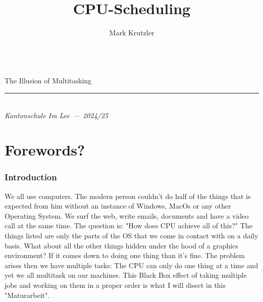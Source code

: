 \documentclass{report}
\title{CPU-Scheduling}
\author{Mark Krutzler}
\newcommand{\thesubtitle}{The Illusion of Multitasking}
\newcommand{\currentdate}{2024/25}
\newcommand{\auinstitution}{Kantonschule Im Lee}
\renewcommand{\maketitle}{
\begin{center}


{\Huge\bfseries
\thetitle}
\vspace{0.5em}\\
{\LARGE\thesubtitle}


{\rule{0.4\textwidth}{.4pt}}

{\bfseries \theauthor}\\
\textit{\auinstitution \ --- \currentdate}
\end{center}
}
\begin{document}
\begin{titlepage}
\vspace*{\fill}
\centering
\maketitle
\vspace*{\fill}
\end{titlepage}

\tableofcontents



\part{Forewords?}

\section{Introduction}

We all use computers.
The modern person couldn't do half of the things that is expected from him without an instance of Windows, MacOs or any other Operating System.
We surf the web, write emails, documents and have a video call at the same time.
The question is: "How does CPU achieve all of this?" The things listed are only the parts of the OS that we come in contact with on a daily basis.
What about all the other things hidden under the hood of a graphics environment? If it comes down to doing one thing than it's fine.
The problem arises then we have multiple tasks: The CPU can only do one thing at a time and yet we all multitask on our machines.
This Black Box effect of taking multiple jobs and working on them in a proper order is what I will disect in this "Maturarbeit".
\end{document}
